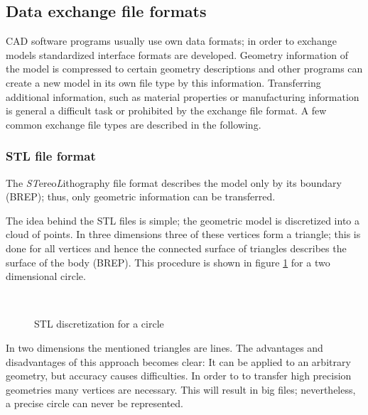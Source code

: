 \subsection{Data exchange file formats}
CAD software programs usually use own data formats; in order to exchange models standardized interface formats are developed. Geometry information of the model is compressed to certain geometry descriptions and other programs can create a new model in its own file type by this information. Transferring additional information, such as material properties or manufacturing information is general a difficult task or prohibited by the exchange file format. A few common exchange file types are described in the following.
\subsubsection{STL file format}
The \emph{ST}ereo\emph{L}ithography file format describes the model only by its boundary (BREP); thus, only geometric information can be transferred. 

The idea behind the STL files is simple; the geometric model is discretized into a cloud of points. In three dimensions  three of these vertices form a triangle; this is done for all vertices and hence the connected surface of triangles describes the surface of the body (BREP). This procedure is shown in figure \ref{fig:STL} for a two dimensional circle.  
\begin{figure}
\centering
   \\
   \caption{STL discretization for a circle}
   \label{fig:STL}
\end{figure}
In two dimensions the mentioned triangles are lines. The advantages and disadvantages of this approach becomes clear: It can be applied to an arbitrary geometry, but accuracy causes difficulties. In order to to transfer high precision geometries many vertices are necessary. This will result in big files; nevertheless, a precise circle can never be represented. 

